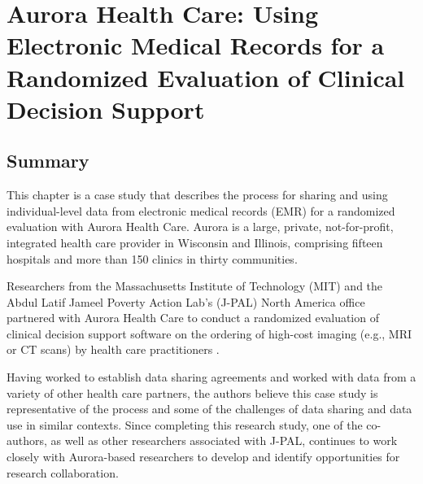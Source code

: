 \hypertarget{ahc}{%
\chapter{Aurora Health Care: Using Electronic Medical Records for a Randomized Evaluation of Clinical Decision Support}\label{ahc}}

\hrulefill

\hypertarget{summary-4}{%
\section{Summary}\label{summary-4}}

This chapter is a case study that describes the process for sharing and using individual-level data from electronic medical records (EMR) for a randomized evaluation with Aurora Health Care. Aurora is a large, private, not-for-profit, integrated health care provider in Wisconsin and Illinois, comprising fifteen hospitals and more than 150 clinics in thirty communities.

Researchers from the Massachusetts Institute of Technology (MIT) and the Abdul Latif Jameel Poverty Action Lab's (J-PAL) North America office partnered with Aurora Health Care to conduct a randomized evaluation of clinical decision support software on the ordering of high-cost imaging (e.g., MRI or CT scans) by health care practitioners \citep{doyle2019}.

Having worked to establish data sharing agreements and worked with data from a variety of other health care partners, the authors believe this case study is representative of the process and some of the challenges of data sharing and data use in similar contexts. Since completing this research study, one of the co-authors, as well as other researchers associated with J-PAL, continues to work closely with Aurora-based researchers to develop and identify opportunities for research collaboration.

